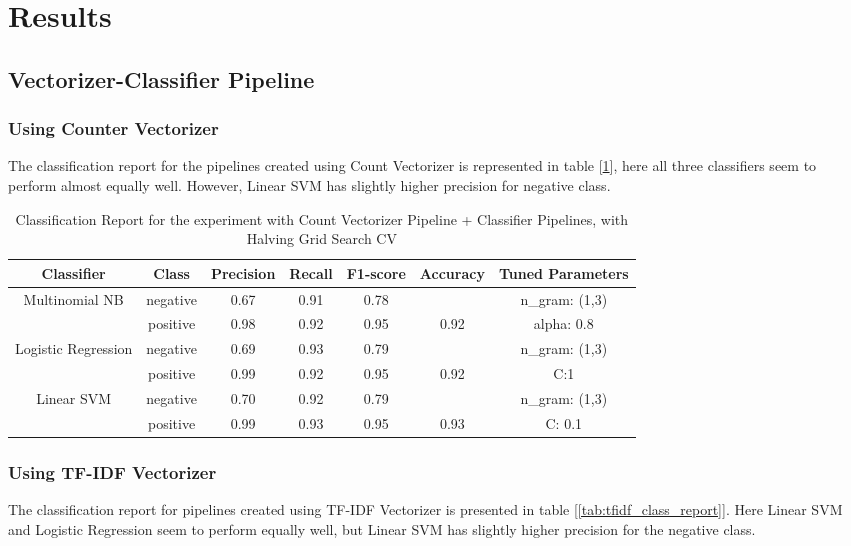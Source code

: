 \documentclass[11pt]{article}
\begin{document}
 \section{Results}

\subsection{Vectorizer-Classifier Pipeline}
\subsubsection{Using Counter Vectorizer}
The classification report for the  pipelines created using Count Vectorizer is represented in table [\ref{tab:cvec_class_report}], here all three classifiers seem to perform almost equally well. However, Linear SVM has slightly higher precision for negative class.
\begin{table}
\centering
    \begin{tabular}{c c c c c c c}
    \hline
       \textbf{Classifier}& \textbf{Class} & \textbf{Precision} &  \textbf{Recall} & \textbf{F1-score}  & \textbf{Accuracy} & \textbf{Tuned Parameters} \\ \hline 
       Multinomial NB & negative &0.67 &0.91 &0.78& &n\_gram: (1,3)  \\
       & positive &0.98&0.92& 0.95 & 0.92 & alpha: 0.8\\ \hline 
       Logistic Regression & negative &0.69& 0.93& 0.79 & & n\_gram: (1,3)\\
       & positive&0.99 &0.92 &0.95&0.92 & C:1\\ \hline 
       Linear SVM & negative& 0.70& 0.92& 0.79 & &  n\_gram: (1,3)\\ 
       & positive & 0.99&0.93 &0.95&0.93 & C: 0.1\\ \hline 
    \end{tabular}
    \caption{Classification Report for the experiment with Count Vectorizer Pipeline + Classifier Pipelines, with Halving Grid Search CV}
    \label{tab:cvec_class_report}
\end{table}
\subsubsection{Using TF-IDF Vectorizer}
The classification report for pipelines created using TF-IDF Vectorizer is presented in table [\ref{tab:tfidf_class_report}]. Here Linear SVM and Logistic Regression seem to perform equally well, but Linear SVM has slightly higher precision for the negative class.
\end{document}

